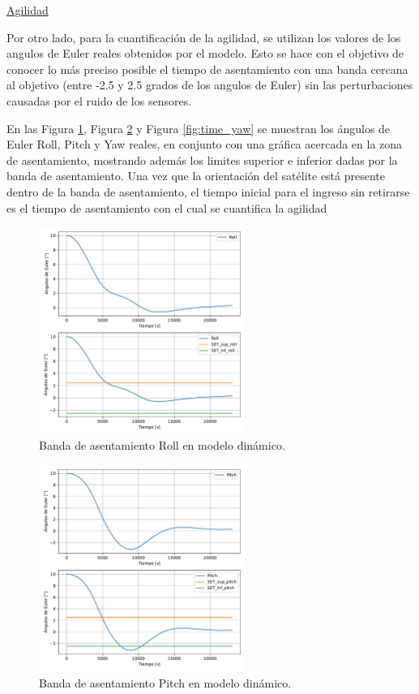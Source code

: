 \underline{Agilidad}

Por otro lado, para la cuantificación de la agilidad, se utilizan los valores de los angulos de Euler reales obtenidos por el modelo. Esto se hace con el objetivo de conocer lo más preciso posible el tiempo de asentamiento con una banda cercana al objetivo (entre -2.5 y 2.5 grados de los angulos de Euler) sin las perturbaciones causadas por el ruido de los sensores.

En las Figura \ref{fig:time_roll}, Figura \ref{fig:time_pitch} y Figura \ref{fig:time_yaw} se muestran los ángulos de Euler Roll, Pitch y Yaw reales, en conjunto con una gráfica acercada en la zona de asentamiento, mostrando además los limites superior e inferior dadas por la banda de asentamiento. Una vez que la orientación del satélite está presente dentro de la banda de asentamiento, el tiempo inicial para el ingreso sin retirarse es el tiempo de asentamiento con el cual se cuantifica la agilidad

\begin{figure}[H]
	\centering    
	\includegraphics[width=0.6\textwidth]{time_roll.pdf}
	\caption{Banda de asentamiento Roll en modelo dinámico.}
	\label{fig:time_roll}
\end{figure}	

\begin{figure}[H]
	\centering    
	\includegraphics[width=0.6\textwidth]{time_pitch.pdf}
	\caption{Banda de asentamiento Pitch en modelo dinámico.}
	\label{fig:time_pitch}
\end{figure}	

